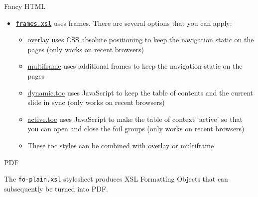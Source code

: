 \documentclass[pdf,frames,slideColor, rcas]{prosper}
\begin{document}
\begin{slide}{Fancy HTML}
\label{id2719423}
\begin{itemize}

	\item 
\href{../frames1/frames.html}{{\tt{frames.xsl}}}
uses frames. There are several options that you can apply:

\begin{itemize}

	\item 
\href{../frames2/frames.html}{overlay} uses CSS absolute positioning
to keep the navigation static on the pages (only works on recent browsers)



	\item 
\href{../frames3/frames.html}{multiframe} uses additional frames
to keep the navigation static on the pages



	\item 
\href{../frames4/frames.html}{dynamic.toc} uses JavaScript to keep
the table of contents and the current slide in sync (only works on recent browsers)



	\item 
\href{../frames5/frames.html}{active.toc} uses JavaScript to make
the table of context `active' so that you can open and close the foil
groups (only works on recent browsers)



	\item 
These toc styles can be combined with
\href{../frames6/frames.html}{overlay} or \href{../frames7/frames.html}{multiframe}


\end{itemize}

\end{itemize}
\end{slide}

\begin{slide}{PDF}
\label{id2719531}

The {\tt{fo-plain.xsl}} stylesheet produces XSL Formatting
Objects that can subsequently be turned into PDF.
\end{slide}
                                                                        

\end{document}
